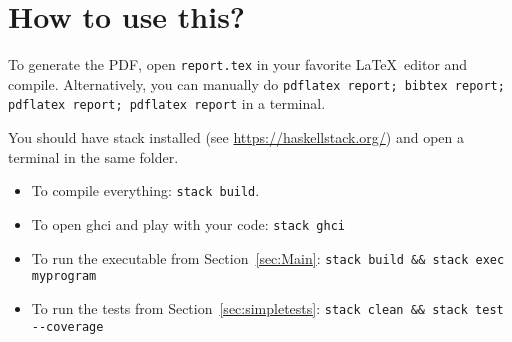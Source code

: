 
\section{How to use this?}

To generate the PDF, open \texttt{report.tex} in your favorite \LaTeX~editor and compile.
Alternatively, you can manually do
\texttt{pdflatex report; bibtex report; pdflatex report; pdflatex report} in a terminal.

You should have stack installed (see \url{https://haskellstack.org/}) and
open a terminal in the same folder.

\begin{itemize}
  \item To compile everything: \verb|stack build|.
  \item To open ghci and play with your code: \verb|stack ghci|
  \item To run the executable from Section~\ref{sec:Main}: \verb|stack build && stack exec myprogram|
  \item To run the tests from Section~\ref{sec:simpletests}: \verb|stack clean && stack test --coverage|
\end{itemize}
